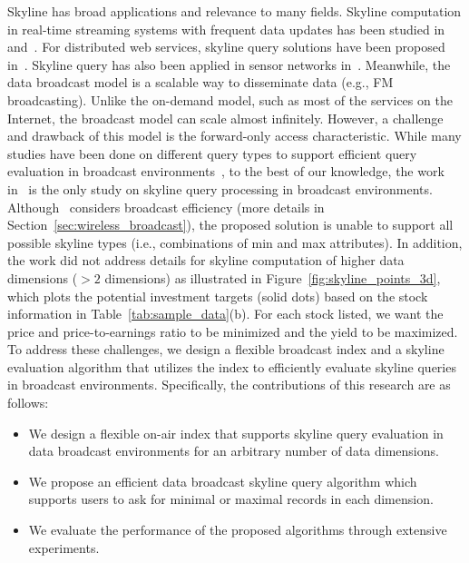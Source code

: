 Skyline has broad applications and relevance to many fields.
Skyline computation in real-time streaming systems with frequent
data updates has been studied in~\cite{conf/icde/LinYWL05}
and~\cite{journals/tkde/TaoP06}. For distributed web services,
skyline query solutions have been proposed
in~\cite{conf/edbt/BalkeGZ04}. Skyline query has also been applied
in sensor networks in~\cite{conf/cikm/ChenLY09}. Meanwhile, the
data broadcast model is a scalable way to disseminate data (e.g.,
FM broadcasting). Unlike the on-demand model, such as most of the
services on the Internet, the broadcast model can scale almost
infinitely. However, a challenge and drawback of this model is the
forward-only access characteristic. While many studies have been
done on different query types to support efficient query
evaluation in broadcast
environments~\cite{conf/dexa/HaKCL09,conf/icde/KuZW07,journals/tmc/KuZW08,
journals/vldb/ZhengLLLS09,conf/cikm/Hara02}, to the best of our
knowledge, the work in~\cite{conf/dexa/HaKCL09} is the only study
on skyline query processing in broadcast environments.
Although~\cite{conf/dexa/HaKCL09} considers broadcast efficiency
(more details in Section~\ref{sec:wireless_broadcast}), the
proposed solution is unable to support all possible skyline types
(i.e., combinations of min and max attributes). In addition, the
work did not address details for skyline computation of higher
data dimensions ($>2$ dimensions) as illustrated in
Figure~\ref{fig:skyline_points_3d}, which plots the potential
investment targets (solid dots) based on the stock information in
Table~\ref{tab:sample_data}(b). For each stock listed, we want the
price and price-to-earnings ratio to be minimized and the yield to
be maximized. To address these challenges, we design a flexible
broadcast index and a skyline evaluation algorithm that utilizes
the index to efficiently evaluate skyline queries in broadcast
environments. Specifically, the contributions of this research are
as follows:

\begin{itemize}
\item We design a flexible on-air index that supports skyline
query evaluation in data broadcast environments for an arbitrary
number of data dimensions.

\item We propose an efficient data broadcast skyline query
algorithm which supports users to ask for minimal or maximal
records in each dimension.

\item We evaluate the performance of the proposed algorithms
through extensive experiments.
\end{itemize}

